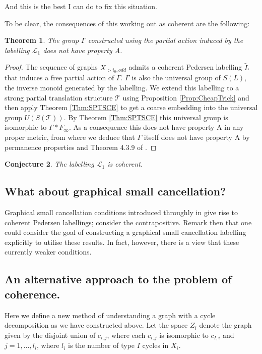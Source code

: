 \documentclass[11pt,a4paper]{amsart}
\theoremstyle{plain}
\newtheorem{theorem}{Theorem}%
\newtheorem{conjecture}[theorem]{Conjecture}
\theoremstyle{definition}%
\theoremstyle{remark}%
\begin{document}
And this is the best I can do to fix this situation.

To be clear, the consequences of this working out as coherent are the following: 

\begin{theorem}
The group $\Gamma$ constructed using the partial action induced by the labelling $\mathcal{L}_{1}$ does not have property A.
\end{theorem}
\begin{proof}
The sequence of graphs $X_{>i_{0},odd}$ admits a coherent Pedersen labelling $\tilde{L}$ that induces a free partial action of $\Gamma$. $\Gamma$ is also the universal group of $S(L)$, the inverse monoid generated by the labelling. We extend this labelling to a strong partial translation structure $\mathcal{T}$ using Proposition \ref{Prop:CheapTrick} and then apply Theorem \ref{Thm:SPTSCE} to get a coarse embedding into the universal group $U(S(\mathcal{T}))$. By Theorem \ref{Thm:SPTSCE} this universal group is isomorphic to $\Gamma \ast F_{\infty}$. As a consequence this does not have property A in any proper metric, from where we deduce that $\Gamma$ itself does not have property A by permanence properties \cite{EG-permanence} and Theorem 4.3.9 of \cite{MR2562146}. 
\end{proof}

\begin{conjecture}
The labelling $\mathcal{L}_{1}$ is coherent.
\end{conjecture}

\subsection{What about graphical small cancellation?}

Graphical small cancellation conditions introduced throughly in \cite{DG-graphical} give rise to coherent Pedersen labellings;  consider the contrapositive. Remark then that one could consider the goal of constructing a graphical small cancellation labelling explicitly to utilise these results. In fact, however, there is a view that these currently weaker conditions.

\subsection{An alternative approach to the problem of coherence.}

Here we define a new method of understanding a graph with a cycle decomposition as we have constructed above. Let the space $Z_{i}$ denote the graph given by the disjoint union of $c_{i,j}$, where each $c_{i,j}$ is isomorphic to $c_{I,i}$ and $j=1,...,l_{i}$, where $l_{i}$ is the number of type $I$ cycles in $X_{i}$. 
\end{document}
